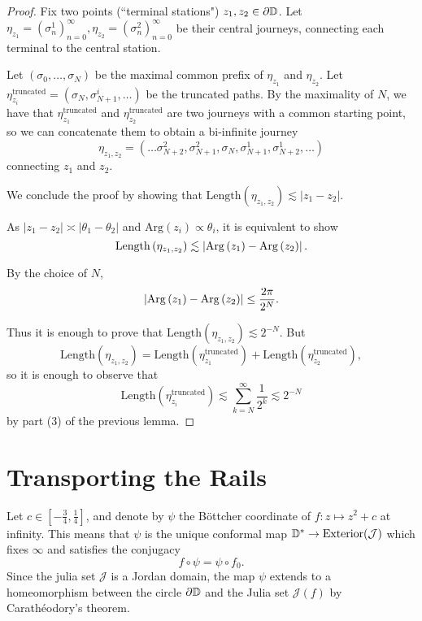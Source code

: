 \begin{proof}
Fix two points (“terminal stations") $z_{1},z_{2}\in\partial\mathbb{D}$.
Let $\eta_{z_{1}}=\left(\sigma_{n}^{1}\right)_{n=0}^{\infty},\eta_{z_{2}}=\left(\sigma_{n}^{2}\right)_{n=0}^{\infty}$
be their central journeys, connecting each terminal to the central
station.

Let $\left(\sigma_{0},\ldots,\sigma_{N}\right)$ be the maximal common
prefix of $\eta_{z_{1}}$ and $\eta_{z_{2}}$. Let $\eta_{z_{i}}^{\text{truncated}}=\left(\sigma_{N},\sigma_{N+1}^{i},\ldots\right)$
be the truncated paths. By the maximality of $N$, we have that $\eta_{z_{1}}^{\text{truncated}}$
and $\eta_{z_{2}}^{\text{truncated}}$ are two journeys with a common
starting point, so we can concatenate them to obtain a bi-infinite
journey 
\[
\eta_{z_{1},z_{2}}=\left(\ldots\sigma_{N+2}^{2},\sigma_{N+1}^{2},\sigma_{N},\sigma_{N+1}^{1},\sigma_{N+2}^{1},\ldots\right)
\]
 connecting $z_{1}$ and $z_{2}$.


We conclude the proof by showing that $\mathrm{Length}\left(\eta_{z_{1},z_{2}}\right)\lesssim\left|z_{1}-z_{2}\right|$.

As $\left|z_{1}-z_{2}\right|\asymp\left|\theta_{1}-\theta_{2}\right|$
and $\mathrm{Arg}\left(z_{i}\right)\propto\theta_{i}$, it is equivalent
to show
\[
\mathrm{Length}\left(\eta_{z_{1},z_{2}}\right)\lesssim\left|\mathrm{Arg}\left(z_{1}\right)-\mathrm{Arg}\left(z_{2}\right)\right|.
\]

By the choice of $N$, 
\[
\left|\mathrm{Arg}\left(z_{1}\right)-\mathrm{Arg}\left(z_{2}\right)\right|\leq\frac{2\pi}{2^{N}}.
\]

Thus it is enough to prove that $\mathrm{Length}\left(\eta_{z_{1},z_{2}}\right)\lesssim2^{-N}$.
But 
\[
\mathrm{Length}\left(\eta_{z_{1},z_{2}}\right)=\mathrm{Length}\left(\eta_{z_{1}}^{\text{truncated}}\right)+\mathrm{Length}\left(\eta_{z_{2}}^{\text{truncated}}\right),
\]
so it is enough to observe that 
\[
\mathrm{Length}\left(\eta_{z_{i}}^{\text{truncated}}\right)\lesssim\sum_{k=N}^{\infty}\frac{1}{2^{k}}\lesssim2^{-N}
\]
by part (3) of the previous lemma.

\end{proof}









\section{Transporting the Rails}
Let $c\in\left[-\frac 34,\frac{1}{4}\right]$, and denote by $\psi$ the Böttcher coordinate of $f: z\mapsto z^2+c$ at infinity. 
This means that $\psi$ is the unique conformal map $\mathbb{D}^{*}\to\mathrm{Exterior}(\mathcal{J})$  which fixes $\infty$ and satisfies the conjugacy $$f\circ\psi=\psi\circ f_{0}.$$
Since the julia set $\mathcal J$ is a Jordan domain, the map $\psi$ extends to a homeomorphism between the circle
$\partial\mathbb{D}$ and the Julia set $\mathcal{J}(f)$ by Carathéodory's
theorem.

